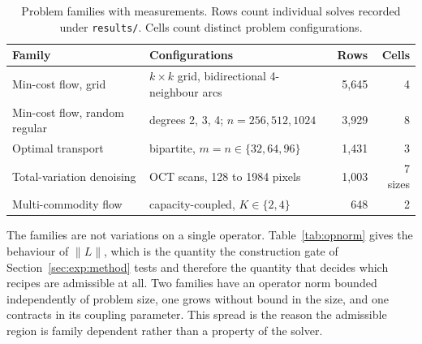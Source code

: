 \begin{table}[t]
\caption{Problem families with measurements. Rows count individual solves
recorded under \texttt{results/}. Cells count distinct problem configurations.}
\label{tab:families}
\begin{center}
\begin{tabular}{llrr}
\toprule
Family & Configurations & Rows & Cells \\
\midrule
Min-cost flow, grid & $k \times k$ grid, bidirectional 4-neighbour arcs & 5{,}645 & 4 \\
Min-cost flow, random regular & degrees 2, 3, 4; $n = 256, 512, 1024$ & 3{,}929 & 8 \\
Optimal transport & bipartite, $m = n \in \{32, 64, 96\}$ & 1{,}431 & 3 \\
Total-variation denoising & OCT scans, 128 to 1984 pixels & 1{,}003 & 7 sizes \\
Multi-commodity flow & capacity-coupled, $K \in \{2, 4\}$ & 648 & 2 \\
\bottomrule
\end{tabular}
\end{center}
\end{table}

The families are not variations on a single operator. Table~\ref{tab:opnorm}
gives the behaviour of $\|L\|$, which is the quantity the construction gate of
Section~\ref{sec:exp:method} tests and therefore the quantity that decides which
recipes are admissible at all. Two families have an operator norm bounded
independently of problem size, one grows without bound in the size, and one
contracts in its coupling parameter. This spread is the reason the admissible
region is family dependent rather than a property of the solver.

